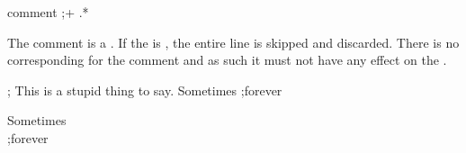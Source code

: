 \begin{identifier}{comment}
;+ .*
\end{identifier} 

The comment is a . If the   is , the entire line is skipped and discarded. There is no corresponding  for the comment  and as such it must not have any effect on the . \\

\begin{examples}
\begin{examplesource}
; This is a stupid thing to say.
Sometimes
;forever
\end{examplesource}
  \begin{exampleoutput}
    Sometimes \\
    ;forever
  \end{exampleoutput}
\end{examples}

